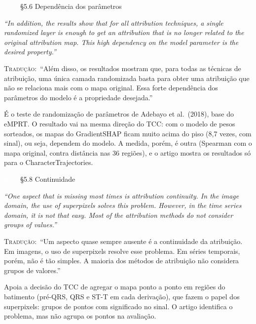 \documentclass[11pt,a4paper]{article}
\newcommand{\pagechip}[1]{{\setlength{\fboxsep}{1.5pt}\colorbox{cAcc}{\textcolor{white}{\scriptsize\texttt{#1}}}}}
\newenvironment{origquote}{\par\itshape\small}{\par}
\newenvironment{tradquote}{\par\small\textsc{Tradução:}\ }{\par}
\newcommand{\explab}[1]{\par\smallskip{\small\color{cAcc}\textbf{\MakeUppercase{#1}}}\par}
\begin{document}
\begin{citacard}{\pagechip{p. 8} §5.6 Dependência dos parâmetros}
\begin{origquote}“In addition, the results show that for all attribution techniques, a single randomized layer is enough to get an attribution that is no longer related to the original attribution map. This high dependency on the model parameter is the desired property.”\end{origquote}
\begin{tradquote}“Além disso, os resultados mostram que, para todas as técnicas de atribuição, uma única camada randomizada basta para obter uma atribuição que não se relaciona mais com o mapa original. Essa forte dependência dos parâmetros do modelo é a propriedade desejada.”\end{tradquote}
\explab{Explicação}
É o teste de randomização de parâmetros de Adebayo et al.\ (2018), base do eMPRT. O resultado vai na mesma direção do TCC: com o modelo de pesos sorteados, os mapas do GradientSHAP ficam muito acima do piso (8,7 vezes, com sinal), ou seja, dependem do modelo. A medida, porém, é outra (Spearman com o mapa original, contra distância nas 36 regiões), e o artigo mostra os resultados só para o CharacterTrajectories.
\end{citacard}

\begin{citacard}{\pagechip{p. 9} §5.8 Continuidade}
\begin{origquote}“One aspect that is missing most times is attribution continuity. In the image domain, the use of superpixels solves this problem. However, in the time series domain, it is not that easy. Most of the attribution methods do not consider groups of values.”\end{origquote}
\begin{tradquote}“Um aspecto quase sempre ausente é a continuidade da atribuição. Em imagens, o uso de superpixels resolve esse problema. Em séries temporais, porém, não é tão simples. A maioria dos métodos de atribuição não considera grupos de valores.”\end{tradquote}
\explab{Explicação}
Apoia a decisão do TCC de agregar o mapa ponto a ponto em regiões do batimento (pré-QRS, QRS e ST-T em cada derivação), que fazem o papel dos superpixels: grupos de pontos com significado no sinal. O artigo identifica o problema, mas não agrupa os pontos na avaliação.
\end{citacard}
\end{document}
